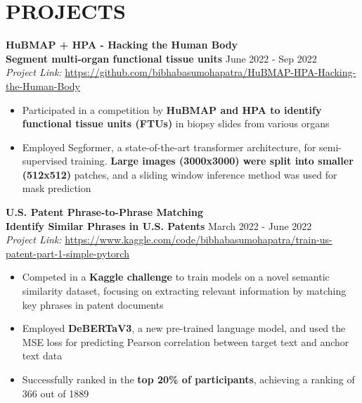 \documentclass[a4paper,10pt]{extarticle}
\begin{document}
{\section*{PROJECTS}
\noindent
\textbf{HuBMAP + HPA - Hacking the Human Body \\ Segment multi-organ functional tissue units} \hfill June 2022 - Sep 2022 \\
\textit{Project Link:} \url{https://github.com/bibhabasumohapatra/HuBMAP-HPA-Hacking-the-Human-Body}  %
\begin{itemize}
    \item Participated in a competition by \textbf{HuBMAP and HPA to identify functional tissue units (FTUs)} in biopsy slides from various organs 
    \vspace{1.2mm}\item Employed Segformer, a state-of-the-art transformer architecture, for semi-supervised training. \textbf{Large images (3000x3000) were split into smaller (512x512)} patches, and a sliding window inference method was used for mask prediction
\end{itemize}
  
\noindent
\textbf{U.S. Patent Phrase-to-Phrase Matching \\ Identify Similar Phrases in U.S. Patents} \hfill March 2022 - June 2022\\ %
\textit{Project Link:} \url{https://www.kaggle.com/code/bibhabasumohapatra/train-us-patent-part-1-simple-pytorch} 
\begin{itemize}
    \item Competed in a \textbf{Kaggle challenge }to train models on a novel semantic similarity dataset, focusing on extracting relevant information by matching key phrases in patent documents
    \vspace{1.2mm}\item  Employed \textbf{DeBERTaV3}, a new pre-trained language model, and used the MSE loss for predicting Pearson correlation between target text and anchor text data
    \vspace{1.2mm}\item Successfully ranked in the \textbf{top 20\% of participants}, achieving a ranking of 366 out of 1889

\end{itemize}

}
\end{document}
